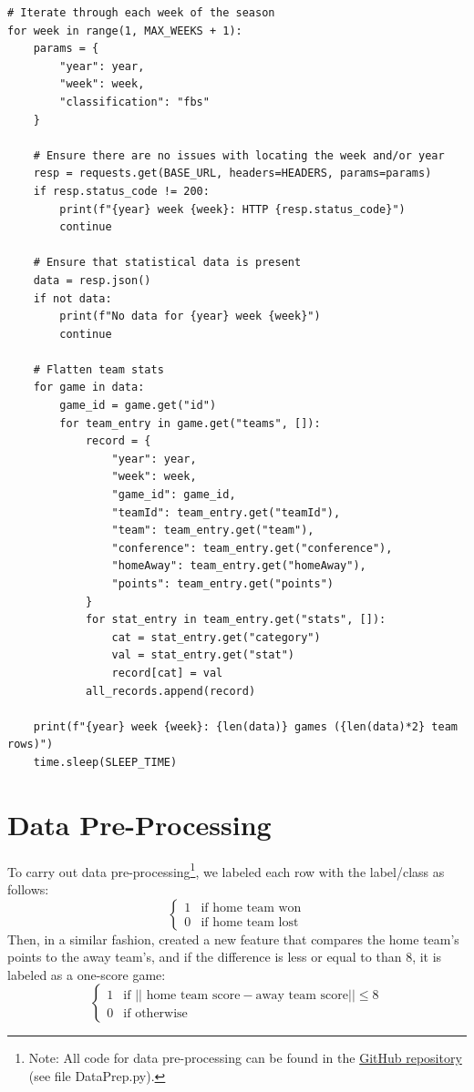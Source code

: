 \documentclass[11pt]{amsart}
\theoremstyle{definition}                  %
\theoremstyle{remark}                       %
\numberwithin{equation}{section}
\begin{document}
\begin{lstlisting}
# Iterate through each week of the season
for week in range(1, MAX_WEEKS + 1):
    params = {
        "year": year,
        "week": week,
        "classification": "fbs"
    }

    # Ensure there are no issues with locating the week and/or year 
    resp = requests.get(BASE_URL, headers=HEADERS, params=params)
    if resp.status_code != 200:
        print(f"{year} week {week}: HTTP {resp.status_code}")
        continue

    # Ensure that statistical data is present
    data = resp.json()
    if not data:
        print(f"No data for {year} week {week}")
        continue

    # Flatten team stats
    for game in data:
        game_id = game.get("id")
        for team_entry in game.get("teams", []):
            record = {
                "year": year,
                "week": week,
                "game_id": game_id,
                "teamId": team_entry.get("teamId"),
                "team": team_entry.get("team"),
                "conference": team_entry.get("conference"),
                "homeAway": team_entry.get("homeAway"),
                "points": team_entry.get("points")
            }
            for stat_entry in team_entry.get("stats", []):
                cat = stat_entry.get("category")
                val = stat_entry.get("stat")
                record[cat] = val
            all_records.append(record)

    print(f"{year} week {week}: {len(data)} games ({len(data)*2} team rows)")
    time.sleep(SLEEP_TIME)
\end{lstlisting}

\section{Data Pre-Processing} 

To carry out data pre-processing\footnote{Note: All code for data pre-processing can be found in the \href{https://github.com/HarounShah/Predicting-Results-of-One-Score-Games-in-College-Football}{GitHub repository} (see file DataPrep.py).}, we labeled each row with the label/class as follows:
\[ \begin{cases} 
      1 & \text{if home team won} \\
      0 & \text{if home team lost}
   \end{cases}
\]
Then, in a similar fashion, created a new feature that compares the home team's points to the away team's, and if the difference is less or equal to than 8, it is labeled as a one-score game:
\[ \begin{cases} 
      1 & \text{if }||\text{ home team score} - \text{away team score}|| \leq  8\\
      0 & \text{if otherwise}
   \end{cases}
\]
\end{document}
